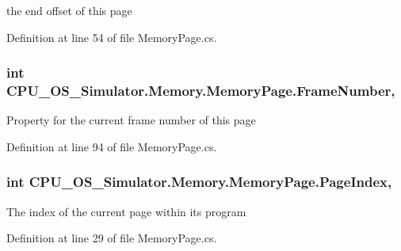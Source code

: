 the end offset of this page 



Definition at line 54 of file Memory\+Page.\+cs.

\hypertarget{class_c_p_u___o_s___simulator_1_1_memory_1_1_memory_page_a89857b70d4065fdc15ce2ea577a7f0ff}{}
\subsubsection[{Frame\+Number}]{\setlength{\rightskip}{0pt plus 5cm}int C\+P\+U\+\_\+\+O\+S\+\_\+\+Simulator.\+Memory.\+Memory\+Page.\+Frame\+Number\hspace{0.3cm}{\ttfamily [get]}, {\ttfamily [set]}}\label{class_c_p_u___o_s___simulator_1_1_memory_1_1_memory_page_a89857b70d4065fdc15ce2ea577a7f0ff}


Property for the current frame number of this page 



Definition at line 94 of file Memory\+Page.\+cs.

\hypertarget{class_c_p_u___o_s___simulator_1_1_memory_1_1_memory_page_aec80700d036a447e7e6ec204513e3a59}{}
\subsubsection[{Page\+Index}]{\setlength{\rightskip}{0pt plus 5cm}int C\+P\+U\+\_\+\+O\+S\+\_\+\+Simulator.\+Memory.\+Memory\+Page.\+Page\+Index\hspace{0.3cm}{\ttfamily [get]}, {\ttfamily [set]}}\label{class_c_p_u___o_s___simulator_1_1_memory_1_1_memory_page_aec80700d036a447e7e6ec204513e3a59}


The index of the current page within its program 



Definition at line 29 of file Memory\+Page.\+cs.

